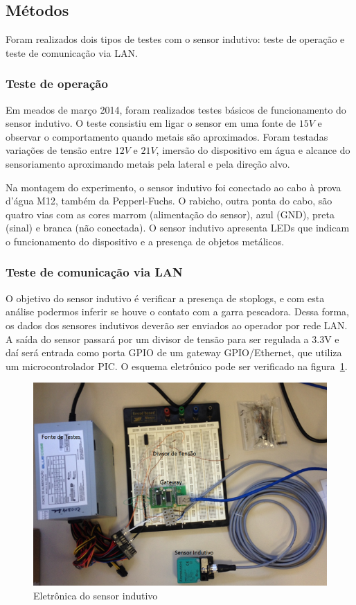 

\subsection{Métodos}
Foram realizados dois tipos de testes com o sensor indutivo: teste de
operação e teste de comunicação via LAN.

\subsubsection{Teste de operação}
Em meados de março 2014, foram realizados testes básicos de funcionamento do
sensor indutivo. O teste consistiu em ligar o sensor em uma fonte de $15V$ e
observar o comportamento quando metais são aproximados. Foram testadas variações
de tensão entre $12V$ e $21V$, imersão do dispositivo em água e alcance do
sensoriamento aproximando metais pela lateral e pela direção alvo.

Na montagem do experimento, o sensor indutivo foi conectado ao cabo à prova
d'água M12, também da Pepperl-Fuchs. O rabicho, outra ponta do cabo, são quatro
vias com as cores marrom (alimentação do sensor), azul (GND), preta (sinal) e
branca (não conectada). O sensor indutivo apresenta LEDs que indicam o
funcionamento do dispositivo e a presença de objetos metálicos.

\subsubsection{Teste de comunicação via LAN}
O objetivo do sensor indutivo é verificar a presença de stoplogs, e com esta
análise podermos inferir se houve o contato com a garra pescadora. Dessa forma,
os dados dos sensores indutivos deverão ser enviados ao operador por rede LAN.
A saída do sensor passará por um divisor de tensão para ser regulada a 3.3V e
daí será entrada como porta GPIO de um gateway GPIO/Ethernet, que utiliza um
microcontrolador PIC. O esquema eletrônico pode ser verificado na
figura~\ref{fig:indu_banc}.

\begin{figure}[h!]
 \centering
 \includegraphics[width=1\columnwidth]{indutivo/figs/indutivo_bancada.png}
 \caption{Eletrônica do sensor indutivo}
 \label{fig:indu_banc}
 \end{figure}


\label{metodos}


